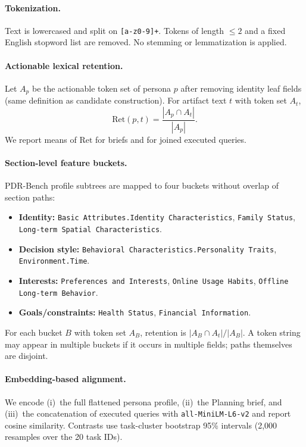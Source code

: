 \documentclass[]{article}
\begin{document}
\paragraph{Tokenization.}
Text is lowercased and split on \texttt{[a-z0-9]+}. Tokens of length
$\le 2$ and a fixed English stopword list are removed. No stemming or
lemmatization is applied.

\paragraph{Actionable lexical retention.}
Let $A_{p}$ be the actionable token set of persona $p$ after removing
identity leaf fields (same definition as candidate construction).
For artifact text $t$ with token set $A_t$,
\[
  \mathrm{Ret}(p,t)=\frac{|A_p\cap A_t|}{|A_p|}.
\]
We report means of $\mathrm{Ret}$ for briefs and for joined executed queries.

\paragraph{Section-level feature buckets.}
PDR-Bench profile subtrees are mapped to four buckets without overlap of
section paths:

\begin{itemize}
  \item \textbf{Identity:} \texttt{Basic Attributes.Identity Characteristics},
    \texttt{Family Status}, \texttt{Long-term Spatial Characteristics}.
  \item \textbf{Decision style:} \texttt{Behavioral Characteristics.Personality Traits},
    \texttt{Environment.Time}.
  \item \textbf{Interests:} \texttt{Preferences and Interests},
    \texttt{Online Usage Habits}, \texttt{Offline Long-term Behavior}.
  \item \textbf{Goals/constraints:} \texttt{Health Status},
    \texttt{Financial Information}.
\end{itemize}
For each bucket $B$ with token set $A_B$, retention is
$|A_B\cap A_t|/|A_B|$. A token string may appear in multiple buckets if it
occurs in multiple fields; paths themselves are disjoint.

\paragraph{Embedding-based alignment.}
We encode (i)~the full flattened persona profile, (ii)~the Planning brief,
and (iii)~the concatenation of executed queries with
\texttt{all-MiniLM-L6-v2} and report cosine similarity.
Contrasts use task-cluster bootstrap 95\% intervals (2{,}000 resamples over
the 20 task IDs).
\end{document}
